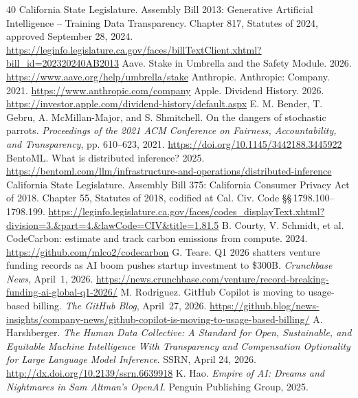 \documentclass[10pt,a4paper,twocolumn]{article}
\renewcommand{\UrlFont}{\scriptsize\ttfamily}
\begin{document}
\newpage
{}
{}
{\small
\setlength{\bibsep}{2pt plus 0.3pt}
\renewcommand{\UrlFont}{\small\ttfamily}
\begin{thebibliography}{40}
 California State Legislature. Assembly Bill 2013: Generative Artificial Intelligence -- Training Data Transparency. Chapter 817, Statutes of 2024, approved September 28, 2024. \url{https://leginfo.legislature.ca.gov/faces/billTextClient.xhtml?bill_id=202320240AB2013}
 Aave. Stake in Umbrella and the Safety Module. 2026. \url{https://www.aave.org/help/umbrella/stake}
 Anthropic. Anthropic: Company. 2021. \url{https://www.anthropic.com/company}
 Apple. Dividend History. 2026. \url{https://investor.apple.com/dividend-history/default.aspx}
 E. M. Bender, T. Gebru, A. McMillan-Major, and S. Shmitchell. On the dangers of stochastic parrots. \emph{Proceedings of the 2021 ACM Conference on Fairness, Accountability, and Transparency}, pp. 610--623, 2021. \url{https://doi.org/10.1145/3442188.3445922}
 BentoML. What is distributed inference? 2025. \url{https://bentoml.com/llm/infrastructure-and-operations/distributed-inference}
 California State Legislature. Assembly Bill 375: California Consumer Privacy Act of 2018. Chapter 55, Statutes of 2018, codified at Cal. Civ. Code \S\S\,1798.100--1798.199. \url{https://leginfo.legislature.ca.gov/faces/codes_displayText.xhtml?division=3.&part=4.&lawCode=CIV&title=1.81.5}
 B. Courty, V. Schmidt, et al. CodeCarbon: estimate and track carbon emissions from compute. 2024. \url{https://github.com/mlco2/codecarbon}
 G. Teare. Q1 2026 shatters venture funding records as AI boom pushes startup investment to \$300B. \emph{Crunchbase News}, April~1, 2026. \url{https://news.crunchbase.com/venture/record-breaking-funding-ai-global-q1-2026/}
 M. Rodriguez. GitHub Copilot is moving to usage-based billing. \emph{The GitHub Blog}, April~27, 2026. \url{https://github.blog/news-insights/company-news/github-copilot-is-moving-to-usage-based-billing/}
 A. Harshberger. \emph{The Human Data Collective: A Standard for Open, Sustainable, and Equitable Machine Intelligence With Transparency and Compensation Optionality for Large Language Model Inference}. SSRN, April 24, 2026. \url{http://dx.doi.org/10.2139/ssrn.6639918}
 K. Hao. \emph{Empire of AI: Dreams and Nightmares in Sam Altman's OpenAI}. Penguin Publishing Group, 2025.

\end{thebibliography}}
\end{document}
